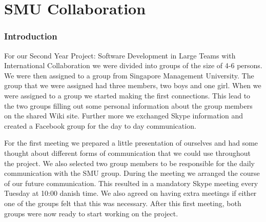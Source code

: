 \part{SMU Collaboration} \label{SmuCollaboration}
\section{Introduction}
For our Second Year Project: Software Development in Large Teams with International Collaboration we were divided into groups of the size of 4-6 persons. We were then assigned to a group from Singapore Management University. The group that we were assigned had three members, two boys and one girl.
When we were assigned to a group we started making the first connections. This lead to the two groups filling out some personal information about the group members on the shared Wiki site. Further more we exchanged Skype information and created a Facebook group for the day to day communication.

For the first meeting we prepared a little presentation of ourselves and had some thought about different forms of communication that we could use throughout the project. We also selected two group members to be responsible for the daily communication with the SMU group. 
During the meeting we arranged the course of our future communication. This resulted in a mandatory Skype meeting every Tuesday at 10:00 danish time.
We also agreed on having extra meetings if either one of the groups felt that this was necessary. After this first meeting, both groups were now ready to start working on the project.

